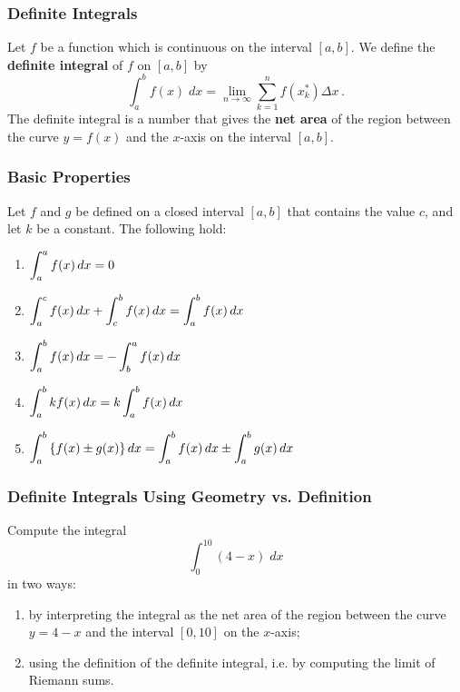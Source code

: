 \documentclass[10pt,t,handout,ignorenonframetext,aspectratio=169]{beamer}
\title[\course]{\lecTitle}
\institute[Ohio State]
{
  \medskip
}
\date[\week]{\semester}
\author{Tae Eun Kim, Ph.D.}
\begin{document}
\begin{frame}
  \titlepage
\end{frame}


\begin{frame}
  \frametitle{Definite Integrals}
  \begin{defn}
    Let $f$ be a function which is continuous on the interval
    $[a,b]$. We define the \textbf{definite integral} of $f$ on $[a, b]$
    by
    \[
      \int_a^b f(x) \; dx = \lim_{n\to\infty} \sum_{k=1}^{n} f(x_k^*) \Delta x \,.
    \]
    The definite integral is a number that gives the \textbf{net area} of the
    region between the curve $y = f(x)$ and the $x$-axis on the interval
    $[a,b]$.
  \end{defn}
\end{frame}

\begin{frame}
  \frametitle{Basic Properties}
  \begin{thm}
    Let $f$ and $g$ be defined on a closed interval $[a,b]$ that
    contains the value $c$, and let $k$ be a constant. The following
    hold:
    \begin{enumerate}
    \item $\displaystyle \int_a^a f(x)\mathop{}\!d x = 0$
    \item $\displaystyle \int_a^c f(x)\mathop{}\!d x + \int_c^b f(x)\mathop{}\!d x = \int_a^b f(x)\mathop{}\!d x$
    \item $\displaystyle \int_a^bf(x)\mathop{}\!d x = -\int_b^a f(x)\mathop{}\!d x$
    \item $\displaystyle \int_a^bk f(x)\mathop{}\!d x = k \int_a^bf(x)\mathop{}\!d x$
    \item $\displaystyle \int_a^b \left\{ f(x)\pm g(x) \right\}  \mathop{}\!d x = \int_a^bf(x)\mathop{}\!d x \pm \int_a^bg(x)\mathop{}\!d x$
    \end{enumerate}
  \end{thm}
\end{frame}


\begin{frame}
  \frametitle{Definite Integrals Using Geometry
    vs. Definition}
  \begin{question}
    Compute the integral
    \[
      \int_{0}^{10} (4 - x)\; dx
    \]
    in two ways:
    \begin{enumerate}
    \item by interpreting the integral as the net area of the region
      between the curve $y=4-x$ and the interval $[0,10]$ on  the
      $x$-axis;
    \item using the definition of the definite integral, i.e. by
      computing the limit of Riemann sums.
    \end{enumerate}
  \end{question}
\end{frame}
\end{document}
